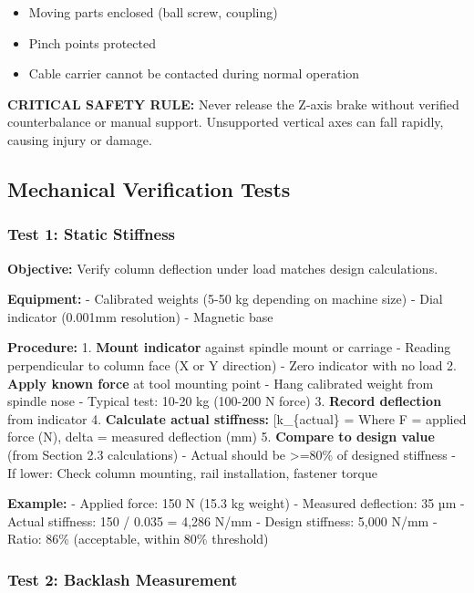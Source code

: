 \documentclass[
]{article}
\providecommand{\tightlist}{%
  \setlength{\itemsep}{0pt}\setlength{\parskip}{0pt}}
\begin{document}
\begin{enumerate}
  \begin{itemize}
  \tightlist
  \item
    Moving parts enclosed (ball screw, coupling)
  \item
    Pinch points protected
  \item
    Cable carrier cannot be contacted during normal operation
  \end{itemize}
\end{enumerate}

\textbf{CRITICAL SAFETY RULE:} Never release the Z-axis brake without
verified counterbalance or manual support. Unsupported vertical axes can
fall rapidly, causing injury or damage.

\subsection{Mechanical Verification
Tests}\label{mechanical-verification-tests}

\subsubsection{Test 1: Static Stiffness}\label{test-1-static-stiffness}

\textbf{Objective:} Verify column deflection under load matches design
calculations.

\textbf{Equipment:} - Calibrated weights (5-50 kg depending on machine
size) - Dial indicator (0.001mm resolution) - Magnetic base

\textbf{Procedure:} 1. \textbf{Mount indicator} against spindle mount or
carriage - Reading perpendicular to column face (X or Y direction) -
Zero indicator with no load 2. \textbf{Apply known force} at tool
mounting point - Hang calibrated weight from spindle nose - Typical
test: 10-20 kg (100-200 N force) 3. \textbf{Record deflection} from
indicator 4. \textbf{Calculate actual stiffness:} {[}k\_\{actual\} =
\frac{F}{\delta}{]} Where F = applied force (N), delta = measured
deflection (mm) 5. \textbf{Compare to design value} (from Section 2.3
calculations) - Actual should be \textgreater=80\% of designed stiffness
- If lower: Check column mounting, rail installation, fastener torque

\textbf{Example:} - Applied force: 150 N (15.3 kg weight) - Measured
deflection: 35 µm - Actual stiffness: 150 / 0.035 = 4,286 N/mm - Design
stiffness: 5,000 N/mm - Ratio: 86\% (acceptable, within 80\% threshold)

\subsubsection{Test 2: Backlash
Measurement}\label{test-2-backlash-measurement}
\end{document}
